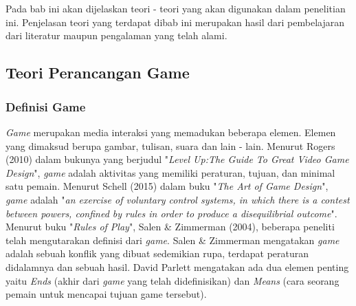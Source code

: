 \chapter{\babDua}
Pada bab ini akan dijelaskan teori - teori yang akan digunakan \saya dalam penelitian ini. Penjelasan teori yang terdapat dibab ini merupakan hasil dari pembelajaran \saya dari literatur maupun pengalaman yang telah \saya alami.
\section{Teori Perancangan Game}
	\subsection{Definisi Game}
	\textit{Game} merupakan media interaksi yang memadukan beberapa elemen. Elemen yang dimaksud berupa gambar, tulisan, suara dan lain - lain. Menurut Rogers (2010) dalam bukunya yang berjudul "\textit{Level Up:The Guide To Great Video Game Design}", \textit{game} adalah aktivitas yang memiliki peraturan, tujuan, dan minimal satu pemain. Menurut Schell (2015) dalam buku "\textit{The Art of Game Design}", \textit{game} adalah "\textit{an exercise of voluntary control systems, in which there is a contest between powers, confined by rules in order to produce a disequilibrial outcome}".
	\linebreak\linebreak
	Menurut buku "\textit{Rules of Play}", Salen \& Zimmerman (2004), beberapa peneliti telah mengutarakan definisi dari \textit{game}. Salen \& Zimmerman mengatakan \textit{game} adalah sebuah konflik yang dibuat sedemikian rupa, terdapat peraturan didalamnya dan sebuah hasil. David Parlett mengatakan ada dua elemen penting yaitu \textit{Ends} (akhir dari  \textit{game} yang telah didefinisikan) dan \textit{Means} (cara seorang pemain untuk mencapai tujuan game tersebut).
